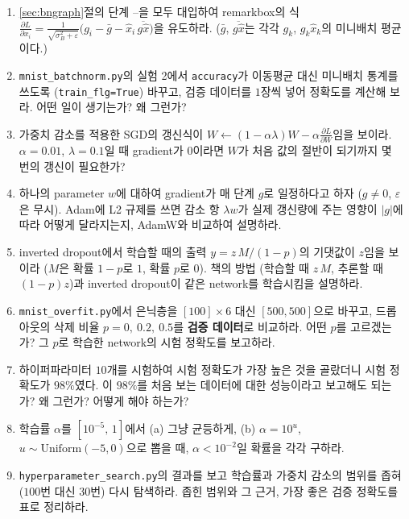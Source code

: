 \documentclass[11pt,a4paper]{article}
\newcommand{\pd}[2]{\frac{\partial #1}{\partial #2}}
\begin{document}
\begin{enumerate}[label=\arabic*.]
\item \ref{sec:bngraph}절의 단계 --을 모두 대입하여
remarkbox의 식 $\pd{L}{x_i}=\frac{1}{\sqrt{\sigma_B^2+\varepsilon}}\bigl(g_i-\bar g-\hat x_i\,\overline{g\hat x}\bigr)$을 유도하라.
($\bar g$, $\overline{g\hat x}$는 각각 $g_k$, $g_k\hat x_k$의 미니배치 평균이다.)

\item \texttt{mnist\_batchnorm.py}의 실험 2에서 \texttt{accuracy}가 이동평균 대신 미니배치 통계를 쓰도록
(\texttt{train\_flg=True}) 바꾸고, 검증 데이터를 $1$장씩 넣어 정확도를 계산해 보라.
어떤 일이 생기는가? 왜 그런가?

\item 가중치 감소를 적용한 SGD의 갱신식이 $W\leftarrow(1-\alpha\lambda)W-\alpha\pd{L}{W}$임을 보이라.
$\alpha=0.01$, $\lambda=0.1$일 때 gradient가 $0$이라면 $W$가 처음 값의 절반이 되기까지 몇 번의 갱신이 필요한가?

\item 하나의 parameter $w$에 대하여 gradient가 매 단계 $g$로 일정하다고 하자 ($g\neq0$, $\varepsilon$은 무시).
Adam에 L2 규제를 쓰면 감소 항 $\lambda w$가 실제 갱신량에 주는 영향이 $|g|$에 따라 어떻게 달라지는지,
AdamW와 비교하여 설명하라.

\item inverted dropout에서 학습할 때의 출력 $y=z\,M/(1-p)$의 기댓값이 $z$임을 보이라
($M$은 확률 $1-p$로 $1$, 확률 $p$로 $0$).
책의 방법 (학습할 때 $z\,M$, 추론할 때 $(1-p)z$)과 inverted dropout이 같은 network를 학습시킴을 설명하라.

\item \texttt{mnist\_overfit.py}에서 은닉층을 $[100]\times6$ 대신 $[500, 500]$으로 바꾸고,
드롭아웃의 삭제 비율 $p=0,\ 0.2,\ 0.5$를 \textbf{검증 데이터}로 비교하라.
어떤 $p$를 고르겠는가? 그 $p$로 학습한 network의 시험 정확도를 보고하라.

\item 하이퍼파라미터 $10$개를 시험하여 시험 정확도가 가장 높은 것을 골랐더니 시험 정확도가 $98\%$였다.
이 $98\%$를 처음 보는 데이터에 대한 성능이라고 보고해도 되는가? 왜 그런가? 어떻게 해야 하는가?

\item 학습률 $\alpha$를 $[10^{-5},\,1]$에서 (a) 그냥 균등하게, (b) $\alpha=10^{u}$, $u\sim\mathrm{Uniform}(-5,0)$으로 뽑을 때,
$\alpha<10^{-2}$일 확률을 각각 구하라.

\item \texttt{hyperparameter\_search.py}의 결과를 보고 학습률과 가중치 감소의 범위를 좁혀
($100$번 대신 $30$번) 다시 탐색하라. 좁힌 범위와 그 근거, 가장 좋은 검증 정확도를 표로 정리하라.

\end{enumerate}

\end{document}
